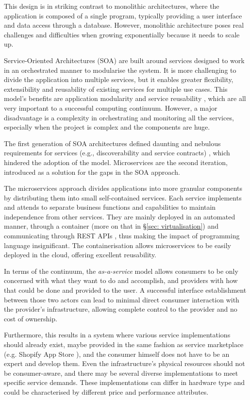 \documentclass{ieeeaccess}
\begin{document}
This design is in striking contrast to monolithic architectures, where the application is composed of a single program, typically providing a user interface and data access through a database. However, monolithic architecture poses real challenges and difficulties when growing exponentially because it needs to scale up.

Service-Oriented Architectures (SOA) are built around services designed to work in an orchestrated manner to modularise the system. It is more challenging to divide the application into multiple services, but it enables greater flexibility, extensibility and reusability of existing services for multiple use cases. This model's benefits are application modularity and service reusability \cite{cloud-to-thing}, which are all very important to a successful computing continuum. However, a major disadvantage is a complexity in orchestrating and monitoring all the services, especially when the project is complex and the components are huge.

The first generation of SOA architectures defined daunting and nebulous requirements for services (e.g., discoverability and service contracts) \cite{microservices-today}, which hindered the adoption of the model. Microservices are the second iteration, introduced as a solution for the gaps in the SOA approach.

The microservices approach divides applications into more granular components by distributing them into small self-contained services. Each service implements and attends to separate business functions and capabilities to maintain independence from other services. They are mainly deployed in an automated manner, through a container (more on that in §\ref{sec: virtualisation}) and communicating through REST APIs \cite{rest}, thus making the impact of programming language insignificant. The containerisation allows microservices to be easily deployed in the cloud, offering excellent reusability.

In terms of the continuum, the \emph{as-a-service} model allows consumers to be only concerned with what they want to do and accomplish, and providers with how that could be done and provided to the user. A successful interface establishment between those two actors can lead to minimal direct consumer interaction with the provider’s infrastructure, allowing complete control to the provider and no cost of ownership.

Furthermore, this results in a system where various service implementations should already exist, maybe provided in the same fashion as service marketplace (e.g. Shopify App Store \cite{shopify}), and the consumer himself does not have to be an expert and develop them. Even the infrastructure's physical resources should not be consumer-aware, and there may be several diverse implementations to meet specific service demands. These implementations can differ in hardware type and could be characterised by different price and performance attributes.
\end{document}
